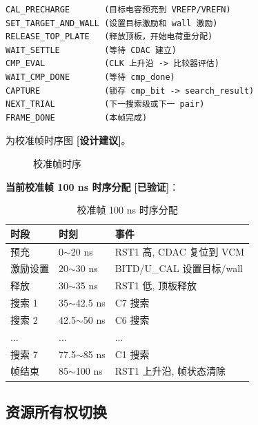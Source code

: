 \documentclass[UTF8,a4paper,11pt]{ctexart}
\newcommand{\verified}{\textcolor{verifiedgreen}{\textbf{[已验证]}}}
\newcommand{\suggested}{\textcolor{suggestblue}{\textbf{[设计建议]}}}
\begin{document}
\begin{lstlisting}[style=textstyle]
CAL_PRECHARGE       (目标电容预充到 VREFP/VREFN)
SET_TARGET_AND_WALL (设置目标激励和 wall 激励)
RELEASE_TOP_PLATE   (释放顶板，开始电荷重分配)
WAIT_SETTLE         (等待 CDAC 建立)
CMP_EVAL            (CLK 上升沿 -> 比较器评估)
WAIT_CMP_DONE       (等待 cmp_done)
CAPTURE             (锁存 cmp_bit -> search_result)
NEXT_TRIAL          (下一搜索级或下一 pair)
FRAME_DONE          (本帧完成)
\end{lstlisting}

 为校准帧时序图 \suggested。

\begin{figure}[H]
\centering
{}
\caption{校准帧时序}
\label{fig:cal-timing}
\end{figure}

\textbf{当前校准帧 100 ns 时序分配} \verified：

\begin{table}[H]
\centering
\caption{校准帧 100 ns 时序分配}
\label{tab:cal-timing}
\begin{tabular}{lll}
\toprule
时段 & 时刻 & 事件 \\
\midrule
预充      & 0$\sim$20 ns      & RST1 高, CDAC 复位到 VCM \\
激励设置  & 20$\sim$30 ns     & BITD/U\_CAL 设置目标/wall \\
释放      & 30$\sim$35 ns     & RST1 低, 顶板释放 \\
搜索 1    & 35$\sim$42.5 ns   & C7 搜索 \\
搜索 2    & 42.5$\sim$50 ns   & C6 搜索 \\
...       & ...               & ... \\
搜索 7    & 77.5$\sim$85 ns   & C1 搜索 \\
帧结束    & 85$\sim$100 ns    & RST1 上升沿, 帧状态清除 \\
\bottomrule
\end{tabular}
\end{table}

\subsection{资源所有权切换}
\end{document}
